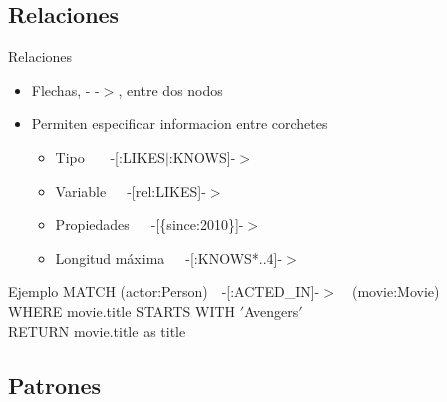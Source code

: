 \documentclass{beamer}
\begin{document}
\subsection{Relaciones}

\begin{frame}{Relaciones}
	\begin{itemize}
		\item Flechas, - -$>$, entre dos nodos
		      \pause
		\item Permiten especificar informacion entre corchetes
		      \pause
		      \begin{itemize}
			      \item Tipo ~~~-[:LIKES$\mid$:KNOWS]-$>$
			            \pause
			      \item Variable~~~-[rel:LIKES]-$>$
			            \pause
			      \item Propiedades~~~-[\{since:2010\}]-$>$
			            \pause
			      \item Longitud máxima~~~-[:KNOWS*..4]-$>$
			            \pause
		      \end{itemize}
	\end{itemize}


	\begin{block}{Ejemplo}
		MATCH (actor:Person)~~-[:ACTED\_IN]-$>$~~(movie:Movie)\\
		WHERE movie.title STARTS WITH $'$Avengers$'$\\
		RETURN movie.title as title
	\end{block}
\end{frame}

\subsection{Patrones}
\end{document}
